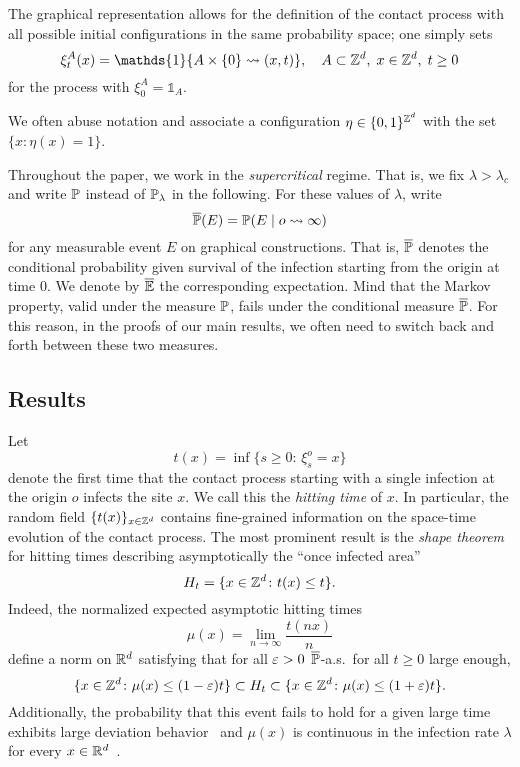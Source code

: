 The graphical representation allows for the definition of the contact process with all possible initial configurations in the same probability space; one simply sets
$$\xi^A_t(x) =  \mathds{1}\{A \times \{0\} \rightsquigarrow (x,t) \},\quad A \subset \Zd,\;x \in \Zd,\; t \geq 0$$
for the process with $\xi^A_0 = \mathds{1}_A$. 

We often abuse notation and associate a configuration $\eta \in \{0,1\}^\Zd$ with the set $\{x:\eta(x) = 1\}$.

Throughout the paper, we work in the \emph{supercritical} regime. That is, we fix $\lambda>\lambda_c$ and write $\P$ instead of $\P_{\lambda}$ in the following. For these values of $\lambda$, write 
\begin{equation}
	\oP(E) = \P(E\mid o \rightsquigarrow \infty)
\end{equation}
for any measurable event $E$ on graphical constructions. That is, $\oP$ denotes the conditional probability given survival of the infection starting from the origin at time 0. We denote by $\oE$ the corresponding expectation. 
Mind that the Markov property, valid under the measure $\P$, fails under the conditional measure $\oP$. For this reason, in the proofs of our main results, we often need to switch back and forth between these two measures. 



\subsection{Results}
Let 
$$t(x) = \inf\{s \ge 0:\, \xi^o_s = x\}$$ 
denote the first time that the contact process starting with a single infection at the origin $o$ infects the site $x$. We call this the \emph{hitting time} of $x$. 
In particular, the random field $\{t(x)\}_{x\in\Zd}$ contains fine-grained information on the space-time evolution of the contact process. The most prominent result is the \emph{shape theorem} for hitting times \cite{BezuiGrimm90, Durre88, DurreGriff82} describing asymptotically the ``once infected area'' 
\[H_t=\{x\in\Zd\colon t(x)\le t\}.\] 
Indeed, the normalized expected asymptotic hitting times
$$\mu(x)= \lim_{n \to \infty} \frac{t(nx)}{n}$$
define a norm on $\Rd$ satisfying that for all $\eps > 0$ $\oP$-a.s.\ for all $t\ge0$ large enough, \begin{equation}
	\{x\in\Zd\colon \mu(x)\le (1-\eps)t\}
	\subset H_t
	\subset \{x\in\Zd\colon \mu(x)\le (1+\eps)t\}.
\end{equation}
Additionally,  the probability that this event fails to hold for a given large time exhibits large deviation behavior~\cite{GaretMarch14} and $\mu(x)$ is continuous in the infection rate $\lambda$ for every $x\in\Rd$~\cite{GaretMarchThere15}. 

